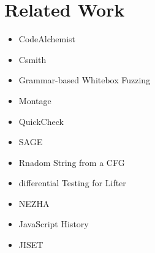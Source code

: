 \section{Related Work}\label{sec:related}

\begin{itemize}
  \item CodeAlchemist\cite{codealchemist}
  \item Csmith\cite{csmith}
  \item Grammar-based Whitebox Fuzzing\cite{grammar-whitebox}
  \item Montage\cite{montage}
  \item QuickCheck\cite{quickcheck}
  \item SAGE\cite{sage}
  \item Rnadom String from a CFG\cite{cfg-gen}
  \item differential Testing for Lifter\cite{ir-diff-test}
  \item NEZHA\cite{nezha}
  \item JavaScript History\cite{js-hopl}
  \item JISET\cite{jiset}

\end{itemize}
